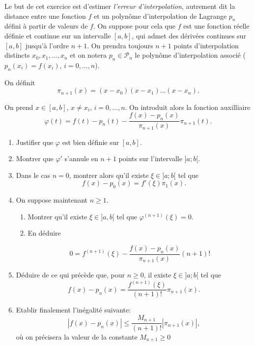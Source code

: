 \begin{exercice}

Le but de cet exercice est d'estimer \emph{l'erreur d'interpolation}, autrement dit la distance entre une fonction $f$ et un polynôme d'interpolation de Lagrange $p_n$ défini à partir de valeurs de $f$. On suppose pour cela que $f$ est une fonction réelle définie et continue sur un intervalle $[a,b]$, qui admet des dérivées continues sur $[a,b]$ jusqu'à l'ordre $n+1$. On prendra toujours $n+1$ points d'interpolation distincts $x_0,x_1,\ldots,x_n$ et on notera $p_n \in \mathcal{P}_n$ le polynôme d'interpolation associé ($p_n(x_i) = f(x_i)$, $i=0,\ldots,n$).

On définit
\[
\pi_{n+1} (x) = (x - x_0) (x - x_1) \ldots (x - x_n).
\]

On prend $x\in[a,b]$, $x\neq x_i$, $i=0,\ldots,n$. On introduit alors la fonction auxilliaire
\[
\varphi(t) = f(t) - p_n(t) - \frac{f(x) - p_n(x)}{\pi_{n+1}(x)} \pi_{n+1}(t).
\]

\begin{enumerate}

\item Justifier que $\varphi$ est bien définie sur $[a,b]$.

\item Montrer que $\varphi'$ s'annule en $n+1$ points sur l'intervalle $]a;b[$.

\item Dans le cas $n=0$, montrer alors qu'il existe $\xi \in ]a;b[$ tel que 
\[
f(x) - p_0(x) = f'(\xi) \pi_1(x).
\]

\item On suppose maintenant $n\geq1$.

\begin{enumerate}

\item Montrer qu'il existe $\xi \in ]a,b[$ tel que $\varphi^{(n+1)}(\xi) = 0$.

\item En déduire

\[
0 = f^{(n+1)} (\xi) - \frac{f(x) - p_n(x)}{\pi_{n+1}(x)} (n+1)!
\]

\end{enumerate}

\item Déduire de ce qui précède que, pour $n\geq0$, il existe $\xi \in ]a;b[$ tel que 
\[
f(x) - p_n(x) = \frac{f^{(n+1)}(\xi)}{(n+1)!} \pi_{n+1}(x).
\]

\item Etablir finalement l'inégalité suivante:
\[
| f(x) - p_n(x) | \leq \frac{M_{n+1}}{(n+1)!} | \pi_{n+1}(x) |,
\]
où on précisera la valeur de la constante $M_{n+1} \geq 0$

\end{enumerate}

\end{exercice}

